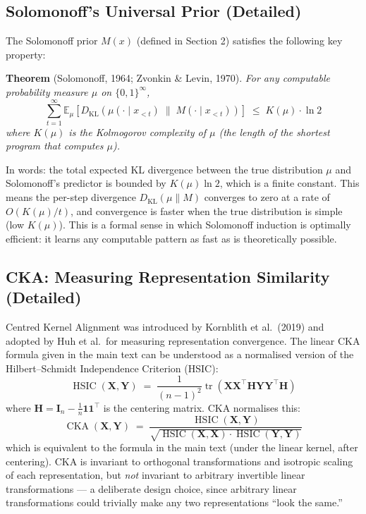 \documentclass[11pt, a4paper]{article}
\begin{document}
\subsection{Solomonoff's Universal Prior (Detailed)}

The Solomonoff prior $M(x)$ (defined in Section 2) satisfies the
following key property:

\textbf{Theorem} (Solomonoff, 1964; Zvonkin \& Levin, 1970).
\emph{For any computable probability measure $\mu$ on $\{0,1\}^\infty$,}
\[
\sum_{t=1}^{\infty} \mathbb{E}_\mu\!\left[
  D_{\text{KL}}\!\left(\mu(\cdot \mid x_{<t}) \;\|\;
  M(\cdot \mid x_{<t})\right)
\right] \;\leq\; K(\mu) \cdot \ln 2
\]
\emph{where $K(\mu)$ is the Kolmogorov complexity of $\mu$ (the length
of the shortest program that computes $\mu$).}

In words: the total expected KL divergence between the true distribution
$\mu$ and Solomonoff's predictor is bounded by $K(\mu) \ln 2$, which is
a finite constant. This means the per-step divergence
$D_{\text{KL}}(\mu \| M)$ converges to zero at a rate of
$O(K(\mu)/t)$, and convergence is faster when the true distribution
is simple (low $K(\mu)$). This is a formal sense in which Solomonoff
induction is optimally efficient: it learns any computable pattern as
fast as is theoretically possible.


\subsection{CKA: Measuring Representation Similarity (Detailed)}

Centred Kernel Alignment was introduced by Kornblith et al.\ (2019) and
adopted by Huh et al.\ for measuring representation convergence. The
linear CKA formula given in the main text can be understood as a
normalised version of the Hilbert--Schmidt Independence Criterion (HSIC):
\[
\operatorname{HSIC}(\mathbf{X}, \mathbf{Y})
\;=\; \frac{1}{(n-1)^2} \operatorname{tr}\!\left(
  \mathbf{X}\mathbf{X}^\top \mathbf{H} \mathbf{Y}\mathbf{Y}^\top
  \mathbf{H}\right)
\]
where $\mathbf{H} = \mathbf{I}_n - \frac{1}{n}\mathbf{1}\mathbf{1}^\top$
is the centering matrix. CKA normalises this:
\[
\operatorname{CKA}(\mathbf{X}, \mathbf{Y})
\;=\; \frac{\operatorname{HSIC}(\mathbf{X}, \mathbf{Y})}
  {\sqrt{\operatorname{HSIC}(\mathbf{X}, \mathbf{X}) \cdot
   \operatorname{HSIC}(\mathbf{Y}, \mathbf{Y})}}
\]
which is equivalent to the formula in the main text (under the linear
kernel, after centering). CKA is invariant to orthogonal transformations
and isotropic scaling of each representation, but \emph{not} invariant to
arbitrary invertible linear transformations --- a deliberate design choice,
since arbitrary linear transformations could trivially make any two
representations ``look the same.''
\end{document}
